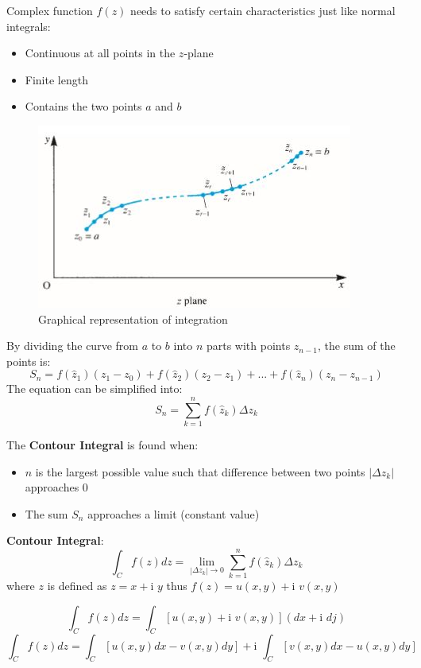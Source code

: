 \documentclass[10pt,a4paper]{article}
\begin{document}
Complex function $f(z)$ needs to satisfy certain characteristics just like normal integrals:
\begin{itemize}
    \item Continuous at all points in the $z$-plane 
    \item Finite length 
    \item Contains the two points $a$ and $b$ 
\end{itemize}

\begin{figure} [h!]
    \centering
    \includegraphics[]{Integral.JPG}
    \caption{Graphical representation of integration}
\end{figure}

By dividing the curve from $a$ to $b$ into $n$ parts with points $z_{n-1}$, the sum of the points
is:
$$
S_n = f(\hat{z}_1)(z_1-z_0)+f(\hat{z}_2)(z_2-z_1)+...+f(\hat{z}_n)(z_n-z_{n-1})
$$
The equation can be simplified into:
$$
S_n = \sum_{k=1}^n f(\hat{z}_k)\Delta z_k
$$

The \textbf{Contour Integral} is found when:
\begin{itemize}
    \item $n$ is the largest possible value such that difference between two points $|\Delta z_k|$ 
    approaches 0
    \item The sum $S_n$ approaches a limit (constant value)
\end{itemize}

\begin{tcolorbox}[breakable,colback=white]
\textbf{Contour Integral}:
$$
\int_C f(z)dz = \lim_{|\Delta z_k|\rightarrow 0} \sum_{k=1}^n f(\hat{z}_k) \Delta z_k
$$
where $z$ is defined as $z=x+\text{i }y$ thus $f(z)=u(x,y)+\text{i }v(x,y)$ \par 
$$
\int_C f(z)dz = \int_C [u(x,y)+\text{i }v(x,y)](dx+\text{i }dj)
$$
$$
\int_C f(z)dz = \int_C [u(x,y)dx - v(x,y)dy] + \text{i }\int_C [v(x,y)dx - u(x,y)dy]
$$
\end{tcolorbox}
\end{document}
